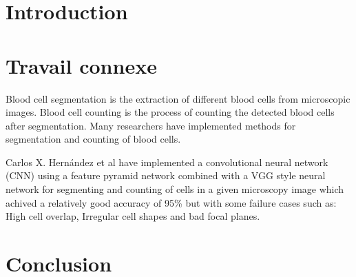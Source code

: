 \section{Introduction}
\vspace{0.2in}
\hspace*{0.16in}

\section{Travail connexe}
\vspace{0.2in}
\hspace*{0.16in}
Blood cell segmentation is the extraction of different blood cells from microscopic images. Blood cell counting is the process of counting the detected blood cells after segmentation. Many researchers have implemented methods for segmentation and counting of blood cells.

Carlos X. Hern{\'{a}}ndez et al \textsuperscript{\cite{DBLP:journals/corr/abs-1802-10548}} have implemented a convolutional neural network (CNN) using a feature pyramid network combined with a VGG style neural network for segmenting and counting of cells in a given microscopy image which achived a relatively good accuracy of 95\% but with some failure cases such as: High cell overlap, Irregular cell shapes and bad focal planes.

\section{Conclusion}
\vspace{0.1in}
\hspace*{0.16in}
